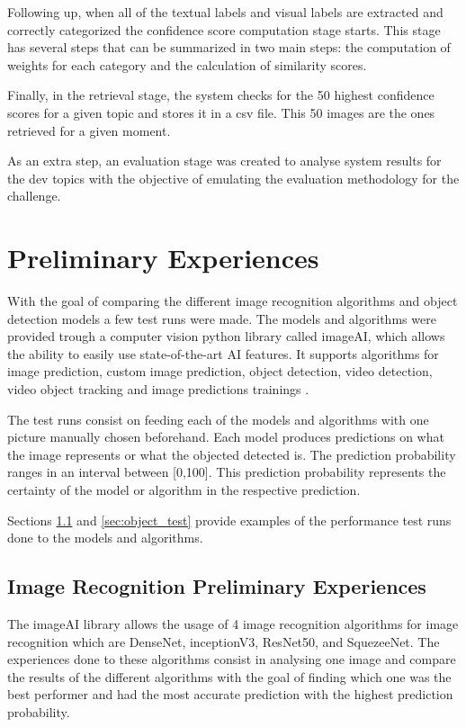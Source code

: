 Following up, when all of the textual labels and visual labels are extracted and correctly categorized the confidence score computation stage starts. This stage has several steps that can be summarized in two main steps: the computation of weights for each category and the calculation of similarity scores.

Finally, in the retrieval stage, the system checks for the 50 highest confidence scores for a given topic and stores it in a csv file. This 50 images are the ones retrieved for a given moment.

As an extra step, an evaluation stage was created to analyse system results for the dev topics with the objective of emulating the evaluation methodology for the challenge.


  
  \section{Preliminary Experiences}
  \label{sec:testruns}

   With the goal of comparing the different image recognition algorithms and object detection models a few test runs were made. The models and algorithms were provided trough a computer vision python library called imageAI, which allows the ability to easily use state-of-the-art AI features. It supports algorithms for image prediction, custom image prediction, object detection, video detection, video object tracking and image predictions trainings \cite{ImageAI}.

  The test runs consist on feeding each of the models and algorithms with one picture manually chosen beforehand. Each model produces predictions on what the image represents or what the objected detected is. The prediction probability ranges in an interval between [0,100]. This prediction probability represents the certainty of the model or algorithm in the respective prediction.


  \par Sections \ref{sec:image_test} and \ref{sec:object_test} provide examples of the performance test runs done to the models and algorithms.

  \subsection{Image Recognition Preliminary Experiences}
  \label{sec:image_test}


  The imageAI library allows the usage of 4 image recognition algorithms for image recognition which are DenseNet, inceptionV3, ResNet50, and SquezeeNet. The experiences done to these algorithms consist in analysing one image and compare the results of the different algorithms with the goal of finding which one was the best performer and had the most accurate prediction with the highest prediction probability.
 
